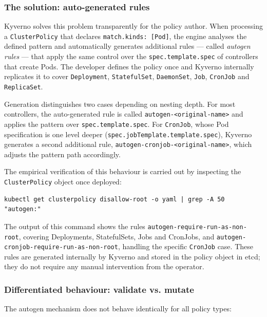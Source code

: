 \subsubsection*{The solution: auto-generated rules}

Kyverno solves this problem transparently for the policy author. When processing a \texttt{ClusterPolicy} that declares \texttt{match.kinds:\,[Pod]}, the engine analyses the defined pattern and automatically generates additional rules --- called \textit{autogen rules} --- that apply the same control over the \texttt{spec.template.spec} of controllers that create Pods. The developer defines the policy once and Kyverno internally replicates it to cover \texttt{Deployment}, \texttt{StatefulSet}, \texttt{DaemonSet}, \texttt{Job}, \texttt{CronJob} and \texttt{ReplicaSet}.

Generation distinguishes two cases depending on nesting depth. For most controllers, the auto-generated rule is called \texttt{autogen-<original-name>} and applies the pattern over \texttt{spec.template.spec}. For \texttt{CronJob}, whose Pod specification is one level deeper (\texttt{spec.jobTemplate.\allowbreak{}template.spec}), Kyverno generates a second additional rule, \texttt{autogen-cronjob-<original-name>}, which adjusts the pattern path accordingly.

The empirical verification of this behaviour is carried out by inspecting the \texttt{ClusterPolicy} object once deployed:

\begin{lstlisting}
kubectl get clusterpolicy disallow-root -o yaml | grep -A 50 "autogen:"
\end{lstlisting}

The output of this command shows the rules \texttt{autogen-require-run-as-non-root}, covering Deployments, StatefulSets, Jobs and CronJobs, and \texttt{autogen-cronjob-require-run-as-non-root}, handling the specific \texttt{CronJob} case. These rules are generated internally by Kyverno and stored in the policy object in etcd; they do not require any manual intervention from the operator.

\subsubsection*{Differentiated behaviour: validate vs. mutate}

The autogen mechanism does not behave identically for all policy types:

